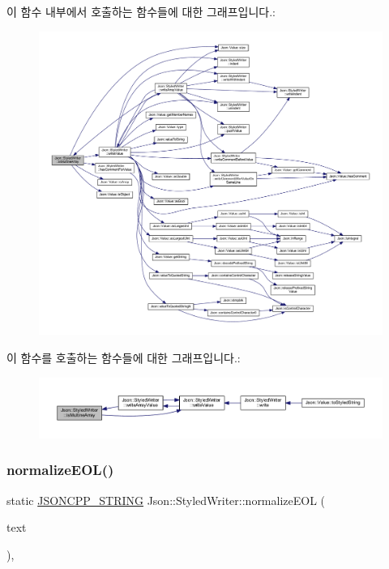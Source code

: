 이 함수 내부에서 호출하는 함수들에 대한 그래프입니다.\+:
\nopagebreak
\begin{figure}[H]
\begin{center}
\leavevmode
\includegraphics[width=350pt]{class_json_1_1_styled_writer_aa5dc671edf10b9976f1511da2271ab9d_cgraph}
\end{center}
\end{figure}
이 함수를 호출하는 함수들에 대한 그래프입니다.\+:\nopagebreak
\begin{figure}[H]
\begin{center}
\leavevmode
\includegraphics[width=350pt]{class_json_1_1_styled_writer_aa5dc671edf10b9976f1511da2271ab9d_icgraph}
\end{center}
\end{figure}
\mbox{\label{class_json_1_1_styled_writer_a692dda1b1621fb5620e0a7b1b10f3b1f}} 
\subsubsection{\texorpdfstring{normalize\+E\+O\+L()}{normalizeEOL()}}
{\footnotesize\ttfamily static \hyperlink{json_8h_a1e723f95759de062585bc4a8fd3fa4be}{J\+S\+O\+N\+C\+P\+P\+\_\+\+S\+T\+R\+I\+NG} Json\+::\+Styled\+Writer\+::normalize\+E\+OL (\begin{DoxyParamCaption}\item[{const \hyperlink{json_8h_a1e723f95759de062585bc4a8fd3fa4be}{J\+S\+O\+N\+C\+P\+P\+\_\+\+S\+T\+R\+I\+NG} \&}]{text }\end{DoxyParamCaption})\hspace{0.3cm}{\ttfamily [static]}, {\ttfamily [private]}}


